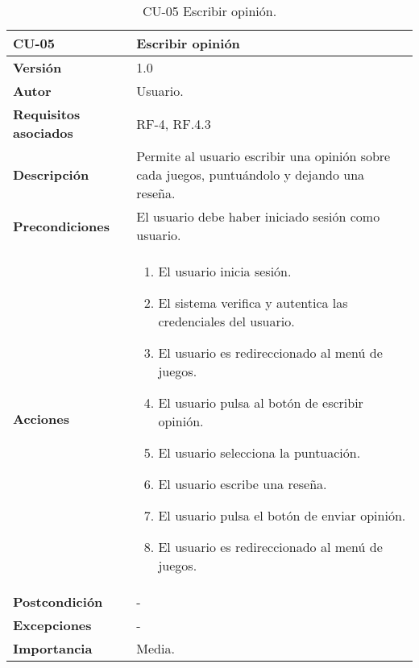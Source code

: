\begin{table}[h!]
	\centering
	\begin{tabularx}{\linewidth}{ p{} p{} }
		\toprule
		\textbf{CU-05}    & \textbf{Escribir opinión}\\
		\toprule
		\textbf{Versión}              & 1.0    \\
		\textbf{Autor}                & Usuario. \\
		\textbf{Requisitos asociados} & RF-4, RF.4.3 \\
		\textbf{Descripción}          & Permite al usuario escribir una opinión sobre cada juegos, puntuándolo y dejando una reseña.\\
		\textbf{Precondiciones}         & El usuario debe haber iniciado sesión como usuario. \\
		\textbf{Acciones}             &
		\begin{enumerate}
			\def\labelenumi{\arabic{enumi}.}
			\tightlist
		\item El usuario inicia sesión.
            \item El sistema verifica y autentica las credenciales del usuario.
            \item El usuario es redireccionado al menú de juegos.
            \item El usuario pulsa al botón de escribir opinión.
            \item El usuario selecciona la puntuación.
            \item El usuario escribe una reseña.
            \item El usuario pulsa el botón de enviar opinión.
            \item El usuario es redireccionado al menú de juegos.
		\end{enumerate}\\
         \textbf{Postcondición}             & - \\
		\textbf{Excepciones}             & - \\
		\textbf{Importancia}          & Media. \\
		\bottomrule
	\end{tabularx}
	\caption{CU-05 Escribir opinión.}
\end{table}

